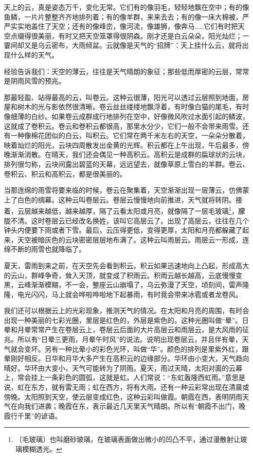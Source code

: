 \documentclass[12pt,UTF-8,openany]{ctexbook}
\begin{document}
\begin{large}
    
    天上的云，真是姿态万千，变化无常。它们有的像羽毛，轻轻地飘在空中；有的像鱼鳞，一片片整整齐齐地排列着；有的像羊群，来来去去；有的像一床大棉被，严严实实地盖住了天空；还有的像峰峦，像河流，像雄狮，像奔马……它们有时把天空点缀得很美丽，有时又把天空笼罩得很阴森。刚才还是白云朵朵，阳光灿烂；一霎间却又是乌云密布，大雨倾盆。云就像是天气的“招牌”：天上挂什么云，就将出现什么样的天气。
    
    经验告诉我们：天空的薄云，往往是天气晴朗的象征；那些低而厚密的云层，常常是阴雨风雪的预兆。
    
    那最轻盈、站得最高的云，叫卷云。这种云很薄，阳光可以透过云层照到地面，房屋和树木的光与影依然很清晰。卷云丝丝缕缕地飘浮着，有时像白猫的尾毛，有时像细薄的白纱。如果卷云成群成行地排列在空中，好像微风吹过水面引起的鳞波，这就成了卷积云。卷云和卷积云都很高，那里水分少，它们一般不会带来雨雪。还有一种像棉花团似的白云，叫积云。它们常在两千米左右的天空，一朵朵分散着，映着灿烂的阳光，云块四周散发出金黄的光辉。积云都在上午出现，午后最多，傍晚渐渐消散。在晴天，我们还会偶见一种高积云。高积云是成群的扁球状的云块，排列很匀称，云块间露出碧蓝的天幕，远远望去，就像草原上雪白的羊群。卷云、卷积云、积云和高积云，都是很美丽的。
    
    当那连绵的雨雪将要来临的时候，卷云在聚集着，天空渐渐出现一层薄云，仿佛蒙上了白色的绸幕。这种云叫卷层云。卷层云慢慢地向前推进，天气就将转阴。接着，云层越来越低，越来越厚，隔了云看太阳或月亮，就像隔了一层毛玻璃\footnote{〔毛玻璃〕也叫磨砂玻璃，在玻璃表面做出微小的凹凸不平，通过漫散射让玻璃模糊透光。}，朦胧不清。这时卷层云已经改名换姓，该叫它高层云了。出现了高层云，往往在几个钟头内便要下雨或者下雪。最后，云压得更低，变得更厚，太阳和月亮都躲藏了起来，天空被暗灰色的云块密密层层地布满了。这种云叫雨层云。雨层云一形成，连绵不断的雨雪也就降临了。
    
    夏天，雷雨到来之前，在天空先会看到积云。积云如果迅速地向上凸起，形成高大的云山，群峰争奇，耸入天顶，就变成了积雨云。积雨云越长越高，云底慢慢变黑，云峰渐渐模糊，不一会，整座云山崩塌了，乌云弥漫了天空，顷刻间，雷声隆隆，电光闪闪，马上就会哗啦哗啦地下起暴雨，有时竟会带来冰雹或者龙卷风。
    
    我们还可以根据云上的光彩现象，推测天气的情况。在太阳和月亮的周围，有时会出现一种美丽的七彩光圈，里层是红色的，外层是紫色的。这种光圈叫做“晕”。日晕和月晕常常产生在卷层云上，卷层云后面的大片高层云和雨层云，是大风雨的征兆。所以有“日晕三更雨，月晕午时风”的说法。说明出现卷层云，并且伴有晕，天气就会变坏。另有一种比晕小的彩色光环，叫做“华”。颜色的排列是里紫外红，跟晕刚好相反。日华和月华大多产生在高积云的边缘部分。华环由小变大，天气趋向晴好。华环由大变小，天气可能转为了阴雨。夏天，雨过天晴，太阳对面的云幕上，常会挂上一条彩色的圆弧，这就是虹。人们常说：“东虹轰隆西虹雨。”意思是说，虹在东方，就有雷无雨；虹在西方，将有大雨。还有一种云彩常出现在清晨或傍晚。太阳照到天空，使云层变成红色，这种云彩叫做霞。朝霞在西，表明阴雨天气在向我们进袭；晚霞在东，表示最近几天里天气晴朗。所以有“朝霞不出门，晚霞行千里”的谚语。
    

\end{large}
\end{document}
